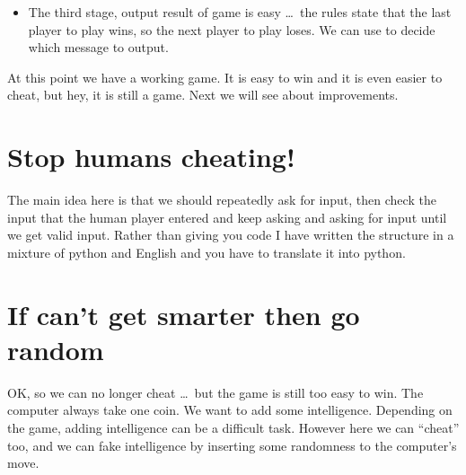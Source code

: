 \documentclass{coderdojo}
\begin{document}
\begin{itemize}

\item[\color{section!70!black}\larger\ding{43}] The third stage, output result of game is easy \ldots\ the rules state that the last player to play wins, so the next player to play loses.  We can use  to decide which message to output.



\end{itemize}

At this point we have a working game.  It is easy to win and it is even easier to cheat, but hey, it is still a game.  Next we will see about improvements.
 
\WeAreDone

\clearpage

\section{Stop humans cheating!}\label{sec:StopHumans}

The main idea here is that we should repeatedly ask for input, then check the input that the human player entered and keep asking and asking for input until we get valid input. 
Rather than giving you code I have written the structure in a mixture of python and English and you have to translate it into python.



\section{If can't get smarter then go random}\label{sec:GoRandom}

OK, so we can no longer cheat \ldots\ but the game is still too easy to win. The computer always take one coin. We want to add some intelligence.
Depending on the game, adding intelligence can be a difficult task. However here we can ``cheat'' too, and we can fake intelligence by inserting some randomness to the computer's move.  
\end{document}
